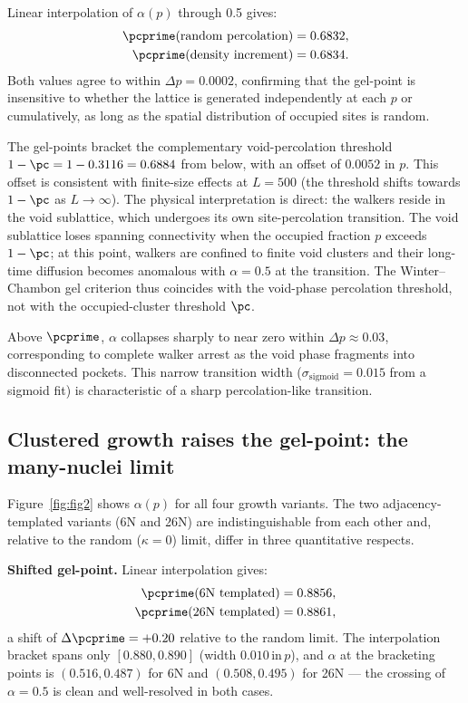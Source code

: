 Linear interpolation of $\alpha(p)$ through 0.5 gives:
\begin{align}
  \pcprime(\text{random percolation}) &= 0.6832, \nonumber \\
  \pcprime(\text{density increment})  &= 0.6834.
  \label{eq:pc_random}
\end{align}
Both values agree to within $\Delta p = 0.0002$, confirming that the gel-point is insensitive to whether the lattice is generated independently at each $p$ or cumulatively, as long as the spatial distribution of occupied sites is random.

The gel-points bracket the complementary void-percolation threshold $1 - \pc = 1 - 0.3116 = 0.6884$ from below, with an offset of $0.0052$ in $p$. This offset is consistent with finite-size effects at $L = 500$ (the threshold shifts towards $1 - \pc$ as $L \to \infty$). The physical interpretation is direct: the walkers reside in the void sublattice, which undergoes its own site-percolation transition. The void sublattice loses spanning connectivity when the occupied fraction $p$ exceeds $1 - \pc$; at this point, walkers are confined to finite void clusters and their long-time diffusion becomes anomalous with $\alpha = 0.5$ at the transition. The Winter--Chambon gel criterion thus coincides with the void-phase percolation threshold, not with the occupied-cluster threshold $\pc$.

Above $\pcprime$, $\alpha$ collapses sharply to near zero within $\Delta p \approx 0.03$, corresponding to complete walker arrest as the void phase fragments into disconnected pockets. This narrow transition width ($\sigma_\mathrm{sigmoid} = 0.015$ from a sigmoid fit) is characteristic of a sharp percolation-like transition.

\subsection{Clustered growth raises the gel-point: the many-nuclei limit}
\label{sec:results_templated}

Figure~\ref{fig:fig2} shows $\alpha(p)$ for all four growth variants. The two adjacency-templated variants (6N and 26N) are indistinguishable from each other and, relative to the random ($\kappa = 0$) limit, differ in three quantitative respects.

\textbf{Shifted gel-point.} Linear interpolation gives:
\begin{align}
  \pcprime(\text{6N templated})  &= 0.8856, \nonumber \\
  \pcprime(\text{26N templated}) &= 0.8861,
  \label{eq:pc_templated}
\end{align}
a shift of $\Delta\pcprime = +0.20$ relative to the random limit. The interpolation bracket spans only $[0.880, 0.890]$ (width $0.010\,\mathrm{in}\,p$), and $\alpha$ at the bracketing points is $(0.516, 0.487)$ for 6N and $(0.508, 0.495)$ for 26N — the crossing of $\alpha = 0.5$ is clean and well-resolved in both cases.

